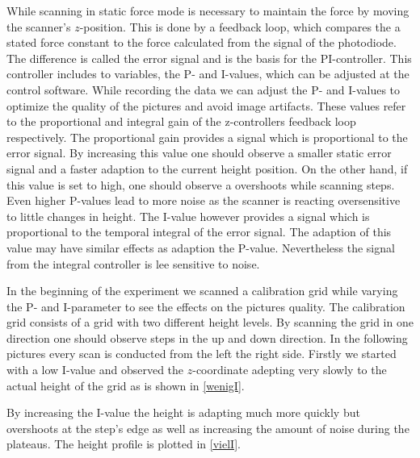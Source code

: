 \documentclass[paper=a4,fontsize=10pt,DIV=18,twocolumn,parskip=half]{scrartcl}
\numberwithin{equation}{section}    %
\begin{document}
While scanning in static force mode is necessary to maintain the force by moving 
the scanner's $z$-position. This is done by a feedback loop, which compares the 
a stated force constant to the force calculated from the signal of the 
photodiode. The difference is called the error signal and is the basis for the 
PI-controller. This controller includes to variables, the P- and I-values, which 
can be adjusted at the control software.
While recording the data we can adjust the P- and I-values to optimize the 
quality of the pictures and avoid image artifacts. These values refer to the 
proportional and integral gain of the z-controllers feedback loop respectively. 
The proportional gain provides a signal which is proportional to the error 
signal. By increasing this value one should observe a smaller static error 
signal and a faster adaption to the current height position.
On the other hand, if this value is set to high, one should observe a overshoots 
while scanning steps. Even higher P-values lead to more noise as the scanner is 
reacting oversensitive to little changes in height. The I-value however provides 
a signal which is proportional to the temporal integral of the error signal. The 
adaption of this value may have similar effects as adaption the P-value. 
Nevertheless the signal from the integral controller is lee sensitive to noise.

In the beginning of the experiment we scanned a calibration grid while varying 
the P- and I-parameter to see the effects on the pictures quality. The 
calibration grid consists of a grid with two different height levels. By 
scanning the grid in one direction one should observe steps in the up and down 
direction. In the following pictures every scan is conducted from the left the 
right side. Firstly we started with a low I-value and observed the 
$z$-coordinate adepting very slowly to the actual height of the grid as is shown 
in \ref{wenigI}.

By increasing the I-value the height is adapting much more quickly but 
overshoots at the step's edge as well as increasing the amount of noise during 
the plateaus. The height profile is plotted in \ref{vielI}.
\end{document}
